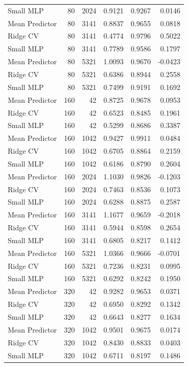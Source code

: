 \begin{table}[htbp]
\begin{tabular}{lrrrrr}
Small MLP & 80 & 2024 & 0.9121 & 0.9267 & 0.0146 \\
Mean Predictor & 80 & 3141 & 0.8837 & 0.9655 & 0.0818 \\
Ridge CV & 80 & 3141 & 0.4774 & 0.9796 & 0.5022 \\
Small MLP & 80 & 3141 & 0.7789 & 0.9586 & 0.1797 \\
Mean Predictor & 80 & 5321 & 1.0093 & 0.9670 & -0.0423 \\
Ridge CV & 80 & 5321 & 0.6386 & 0.8944 & 0.2558 \\
Small MLP & 80 & 5321 & 0.7499 & 0.9191 & 0.1692 \\
Mean Predictor & 160 & 42 & 0.8725 & 0.9678 & 0.0953 \\
Ridge CV & 160 & 42 & 0.6523 & 0.8485 & 0.1961 \\
Small MLP & 160 & 42 & 0.5299 & 0.8686 & 0.3387 \\
Mean Predictor & 160 & 1042 & 0.9427 & 0.9911 & 0.0484 \\
Ridge CV & 160 & 1042 & 0.6705 & 0.8864 & 0.2159 \\
Small MLP & 160 & 1042 & 0.6186 & 0.8790 & 0.2604 \\
Mean Predictor & 160 & 2024 & 1.1030 & 0.9826 & -0.1203 \\
Ridge CV & 160 & 2024 & 0.7463 & 0.8536 & 0.1073 \\
Small MLP & 160 & 2024 & 0.6288 & 0.8875 & 0.2587 \\
Mean Predictor & 160 & 3141 & 1.1677 & 0.9659 & -0.2018 \\
Ridge CV & 160 & 3141 & 0.5944 & 0.8598 & 0.2654 \\
Small MLP & 160 & 3141 & 0.6805 & 0.8217 & 0.1412 \\
Mean Predictor & 160 & 5321 & 1.0366 & 0.9666 & -0.0701 \\
Ridge CV & 160 & 5321 & 0.7236 & 0.8231 & 0.0995 \\
Small MLP & 160 & 5321 & 0.6292 & 0.8242 & 0.1950 \\
Mean Predictor & 320 & 42 & 0.9282 & 0.9653 & 0.0371 \\
Ridge CV & 320 & 42 & 0.6950 & 0.8292 & 0.1342 \\
Small MLP & 320 & 42 & 0.6643 & 0.8277 & 0.1634 \\
Mean Predictor & 320 & 1042 & 0.9501 & 0.9675 & 0.0174 \\
Ridge CV & 320 & 1042 & 0.8430 & 0.8833 & 0.0403 \\
Small MLP & 320 & 1042 & 0.6711 & 0.8197 & 0.1486 \\

\end{tabular}
\end{table}
